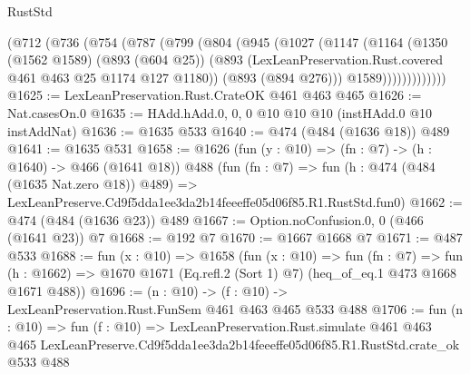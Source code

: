 \begin{lexlean}{RustStd}
\begin{coremodule}
          (@712
            (@736
              (@754
                (@787
                  (@799
                    (@804
                      (@945
                        (@1027
                          (@1147
                            (@1164
                              (@1350
                                (@1562 @1589)
                                (@893 (@604 @25))
                                (@893
                                  (LexLeanPreservation.Rust.covered @461 @463 @25 @1174 @127 @1180))
                                (@893 (@894 @276)))
                              @1589)))))))))))))
@1625 := LexLeanPreservation.Rust.CrateOK @461 @463 @465
@1626 := Nat.casesOn.{0}
@1635 := HAdd.hAdd.{0, 0, 0} @10 @10 @10 (instHAdd.{0} @10 instAddNat)
@1636 := @1635 @533
@1640 := @474 (@484 (@1636 @18)) @489
@1641 := @1635 @531
@1658 := @1626
    (fun (y : @10) => (fn : @7) -> (h : @1640) -> @466 (@1641 @18))
    @488
    (fun (fn : @7) =>
    fun (h : @474 (@484 (@1635 Nat.zero @18)) @489) =>
    LexLeanPreserve.Cd9f5dda1ee3da2b14feeeffe05d06f85.R1.RustStd.fun0)
@1662 := @474 (@484 (@1636 @23)) @489
@1667 := Option.noConfusion.{0, 0} (@466 (@1641 @23)) @7
@1668 := @192 @7
@1670 := @1667 @1668 @7
@1671 := @487 @533
@1688 := fun (x : @10) =>
  @1658
    (fun (x : @10) =>
    fun (fn : @7) =>
    fun (h : @1662) => @1670 @1671 (Eq.refl.{2} (Sort 1) @7) (heq_of_eq.{1} @473 @1668 @1671 @488))
@1696 := (n : @10) -> (f : @10) -> LexLeanPreservation.Rust.FunSem @461 @463 @465 @533 @488
@1706 := fun (n : @10) =>
  fun (f : @10) =>
  LexLeanPreservation.Rust.simulate
    @461
    @463
    @465
    LexLeanPreserve.Cd9f5dda1ee3da2b14feeeffe05d06f85.R1.RustStd.crate_ok
    @533
    @488
\end{coremodule}
\end{lexlean}
